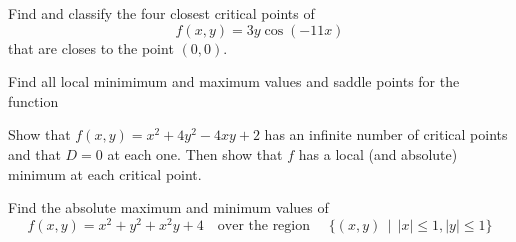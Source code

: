 \documentclass[12pt]{exam}
\begin{document}
\begin{questions}

\question Find and classify the four closest critical points of 
\[
    f(x,y)=3y\cos(-11x)
\] that are closes to the point \((0,0)\).
    \ifprintanswers
        \begin{solution}
        \end{solution}
    \else
        \vfill
    \fi

\question Find all local minimimum and maximum values and saddle points for the function

\question Show that \(f(x,y)=x^2+4y^2-4xy+2\) has an infinite number of critical points and that \(D=0\) at each one. Then show that \(f\) has a local (and absolute) minimum at each critical point.
    \ifprintanswers
        \begin{solution}
        \end{solution}
    \else
        \vfill
    \fi

\question Find the absolute maximum and minimum values of
\[
    f(x,y)=x^2+y^2+x^2y+4\quad\text{over the region }\quad 
\{(x,y)~~|~~|x|\le1,|y|\le1\}
    
\]
    \ifprintanswers
        \begin{solution}
        \end{solution}
    \else
        \vfill
    \fi


\end{questions}
\end{document}
